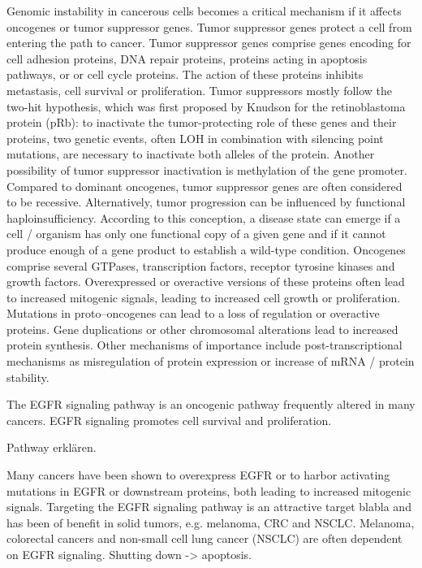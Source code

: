     Genomic instability in cancerous cells becomes a critical mechanism if it
    affects oncogenes or tumor suppressor genes. Tumor suppressor genes protect
    a cell from entering the path to cancer. Tumor suppressor genes comprise
    genes encoding for cell adhesion proteins,  DNA repair proteins, proteins
    acting in apoptosis pathways, or or cell cycle proteins. The action of these
    proteins inhibits metastasis, cell survival or proliferation. Tumor
    suppressors mostly follow the two-hit hypothesis, which was first proposed
    by Knudson  for the retinoblastoma protein (pRb): to inactivate the
    tumor-protecting role of these genes and their proteins, two genetic events,
    often LOH in  combination with silencing point mutations, are necessary to
    inactivate both alleles of the protein. Another possibility of tumor
    suppressor inactivation is methylation of the gene promoter. Compared to
    dominant oncogenes, tumor suppressor genes are often considered to be
    recessive. Alternatively, tumor progression can be influenced by functional
    haploinsufficiency. According to this conception, a disease state can emerge
    if a cell / organism has only one functional  copy of a given gene and if it
    cannot  produce enough of a gene product to establish a wild-type condition.
    Oncogenes comprise several GTPases, transcription factors, receptor tyrosine
    kinases and growth factors. Overexpressed or overactive versions of these
    proteins often lead to increased mitogenic signals, leading to increased
    cell growth or proliferation. Mutations in proto--oncogenes can lead to a
    loss of regulation or overactive proteins. Gene duplications or other
    chromosomal alterations lead to increased protein synthesis. Other
    mechanisms of importance include post-transcriptional mechanisms as
    misregulation of protein expression or increase of mRNA / protein stability.

    The EGFR signaling pathway is an oncogenic pathway frequently altered in
    many cancers. EGFR signaling promotes cell survival and proliferation.

    Pathway erklären.

    Many cancers have been shown to overexpress EGFR or to harbor activating
    mutations in EGFR or downstream proteins, both leading to increased
    mitogenic signals. Targeting the EGFR signaling pathway is an attractive
    target blabla and has been of benefit in solid tumors, e.g. melanoma, CRC
    and NSCLC. Melanoma, colorectal cancers and non-small cell lung cancer
    (NSCLC) are often dependent on EGFR signaling. Shutting down -> apoptosis.


